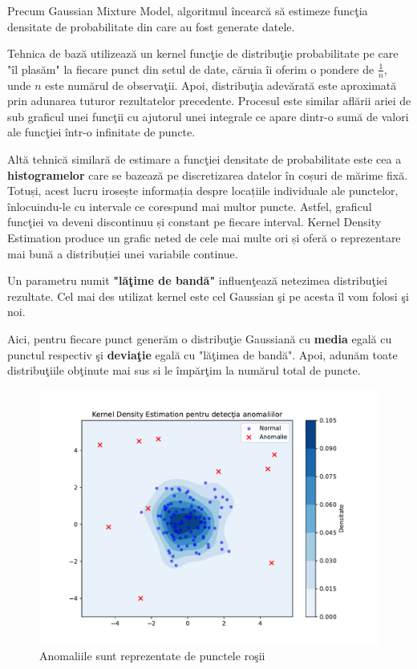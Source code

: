 Precum Gaussian Mixture Model, algoritmul încearcă să estimeze 
funcţia densitate de probabilitate din care au fost generate datele.

Tehnica de bază utilizează un kernel funcţie de distribuţie probabilitate
pe care "îl plasăm" la fiecare punct din setul de date, căruia îi oferim o pondere 
de $\frac{1}{n}$, unde $n$ este numărul de observaţii. Apoi, distribuţia adevărată
este aproximată prin adunarea tuturor rezultatelor precedente. Procesul este similar 
aflării ariei de sub graficul unei funcţii cu ajutorul unei integrale ce 
apare dintr-o sumă de valori ale funcţiei într-o infinitate de puncte.

Altă tehnică similară de estimare a funcţiei densitate de 
probabilitate este cea a \textbf{histogramelor}
care se bazează
pe discretizarea datelor în coșuri de mărime fixă. 
Totuși, acest lucru irosește informația despre 
locațiile individuale ale punctelor, înlocuindu-le 
cu intervale ce corespund mai multor puncte. 
Astfel, graficul funcţiei va deveni discontinuu și 
constant pe fiecare interval. Kernel Density Estimation 
produce un grafic neted de cele mai multe ori și 
oferă o reprezentare mai bună a distribuției unei variabile 
continue\cite{KDE_paper}.

Un parametru numit \textbf{"lăţime de bandă"} influenţează netezimea distribuţiei 
rezultate.
Cel mai des utilizat kernel este cel Gaussian şi pe acesta îl vom folosi şi noi.

Aici, pentru fiecare punct generăm o distribuţie Gaussiană cu \textbf{media} egală
cu punctul respectiv şi \textbf{deviaţie} egală cu "lăţimea de bandă". Apoi, adunăm toate 
distribuţiile obţinute mai sus si le împărţim la numărul total de puncte.

\begin{figure}[H]
    \centering
    \includegraphics[width=\linewidth]{images/kde_anomalies.pdf}
    \caption{Anomaliile sunt reprezentate de punctele roşii}
\end{figure}


